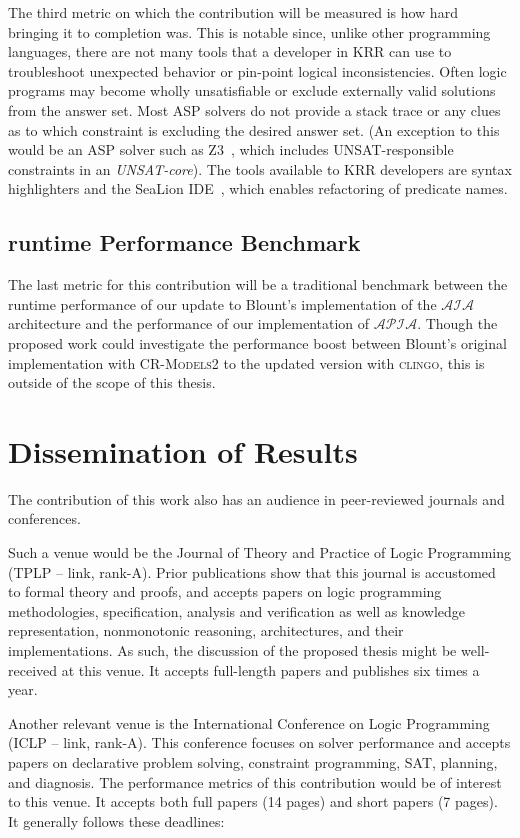 The third metric on which the contribution will be measured is how hard bringing it to completion was.
This is notable since, unlike other programming languages, there are not many tools that a developer in KRR can use to troubleshoot unexpected behavior or pin-point logical inconsistencies.
Often logic programs may become wholly unsatisfiable or exclude externally valid solutions from the answer set.
Most ASP solvers do not provide a stack trace or any clues as to which constraint is excluding the desired answer set.
(An exception to this would be an ASP solver such as Z3~\citep{de_moura_z3_2008}, which includes UNSAT-responsible constraints in an \textit{UNSAT-core}).
The tools available to KRR developers are syntax highlighters and the SeaLion IDE~\citep{busoniu_sealion_2013}, which enables refactoring of predicate names.

\subsection{runtime Performance Benchmark}

The last metric for this contribution will be a traditional benchmark between the runtime performance of our update to Blount's implementation of the $\mathcal{AIA}$ architecture and the performance of our implementation of $\mathcal{APIA}$.
Though the proposed work could investigate the performance boost between Blount's original implementation with \textsc{CR-Models2} to the updated version with \textsc{clingo}, this is outside of the scope of this thesis.

\section{Dissemination of Results}

The contribution of this work also has an audience in peer-reviewed journals and conferences.

Such a venue would be the Journal of Theory and Practice of Logic Programming (TPLP – link, rank-A).
Prior publications show that this journal is accustomed to formal theory and proofs, and accepts papers on logic programming methodologies, specification, analysis and verification as well as knowledge representation, nonmonotonic reasoning, architectures, and their implementations.
As such, the discussion of the proposed thesis might be well-received at this venue.
It accepts full-length papers and publishes six times a year.

Another relevant venue is the International Conference on Logic Programming (ICLP – link, rank-A).
This conference focuses on solver performance and accepts papers on declarative problem solving, constraint programming, SAT, planning, and diagnosis.
The performance metrics of this contribution would be of interest to this venue.
It accepts both full papers (14 pages) and short papers (7 pages).
It generally follows these deadlines:

